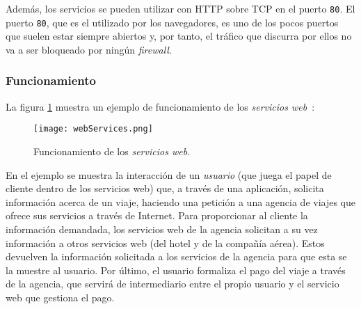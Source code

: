 Además, los servicios se pueden utilizar con \acs{HTTP} sobre \acs{TCP} en el 
puerto \texttt{80}. El puerto \texttt{80}, que es el utilizado por los 
navegadores, es uno de los pocos puertos que suelen estar siempre abiertos y, 
por tanto, el tráfico que discurra por ellos no va a ser bloqueado por ningún 
\emph{firewall}.

  \subsubsection{Funcionamiento}
La figura \ref{fig:webServices} muestra un ejemplo de funcionamiento de los
\emph{servicios web}~\cite{bib:webServices}:

  \begin{figure}[H]
    \begin{center}
      \texttt{[image: webServices.png]}
      \caption{Funcionamiento de los \emph{servicios web}.}
      \label{fig:webServices}
    \end{center}
  \end{figure}

En el ejemplo se muestra la interacción de un \emph{usuario} (que juega el
papel de cliente dentro de los servicios web) que, a través de una aplicación,
solicita información acerca de un viaje, haciendo una petición a una agencia
de viajes que ofrece sus servicios a través de Internet. Para proporcionar al
cliente la información demandada, los servicios web de la agencia solicitan a
su vez información a otros servicios web (del hotel y de la compañía aérea).
Estos devuelven la información solicitada a los servicios de la agencia para
que esta se la muestre al usuario. Por último, el usuario formaliza el pago del
viaje a través de la agencia, que servirá de intermediario entre el propio
usuario y el servicio web que gestiona el pago.

